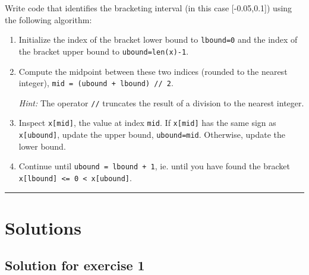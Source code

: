 \documentclass[10pt]{scrartcl}
\begin{document}
    Write code that identifies the bracketing interval (in this case
{[}-0.05,0.1{]}) using the following algorithm:

\begin{enumerate}
\def\labelenumi{\arabic{enumi}.}
\item
  Initialize the index of the bracket lower bound to \texttt{lbound=0}
  and the index of the bracket upper bound to \texttt{ubound=len(x)-1}.
\item
  Compute the midpoint between these two indices (rounded to the nearest
  integer), \texttt{mid\ =\ (ubound\ +\ lbound)\ //\ 2}.

  \emph{Hint:} The operator \texttt{//} truncates the result of a
  division to the nearest integer.
\item
  Inspect \texttt{x{[}mid{]}}, the value at index \texttt{mid}. If
  \texttt{x{[}mid{]}} has the same sign as \texttt{x{[}ubound{]}},
  update the upper bound, \texttt{ubound=mid}. Otherwise, update the
  lower bound.
\item
  Continue until \texttt{ubound\ =\ lbound\ +\ 1}, ie. until you have
  found the bracket
  \texttt{x{[}lbound{]}\ \textless{}=\ 0\ \textless{}\ x{[}ubound{]}}.
\end{enumerate}

    \begin{center}\rule{0.5\linewidth}{0.5pt}\end{center}

\hypertarget{solutions}{%
\section{Solutions}\label{solutions}}

    \hypertarget{solution-for-exercise-1}{%
\subsection{Solution for exercise 1}\label{solution-for-exercise-1}}
\end{document}
